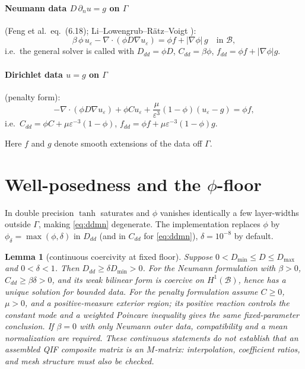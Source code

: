 \documentclass[11pt]{article}
\newtheorem{lemma}[theorem]{Lemma}
\theoremstyle{remark}
\newcommand{\dive}{\nabla\!\cdot\!}
\newcommand{\eps}{\varepsilon}
\newcommand{\B}{\mathcal{B}}
\begin{document}
\paragraph{Neumann data $D\,\partial_n u = g$ on $\Gamma$} (Feng et
al.\ eq.~(6.18); Li--Lowengrub--R\"atz--Voigt \cite{LLRV}):
\begin{equation}\label{eq:ddmn}
  \beta\,\phi\,u_\eps-\dive(\phi D\nabla u_\eps)
  = \phi f + |\nabla\phi|\,g
  \quad\text{in }\B,
\end{equation}
i.e.\ the general solver is called with
$D_{dd}=\phi D$, $C_{dd}=\beta\phi$, $f_{dd}=\phi f+|\nabla\phi|g$.

\paragraph{Dirichlet data $u=g$ on $\Gamma$} (penalty form):
\begin{equation}\label{eq:ddmd}
  -\dive(\phi D\nabla u_\eps)+\phi C u_\eps
  +\frac{\mu}{\eps^3}(1-\phi)(u_\eps-g)=\phi f ,
\end{equation}
i.e.\ $C_{dd}=\phi C+\mu\eps^{-3}(1-\phi)$,
$f_{dd}=\phi f+\mu\eps^{-3}(1-\phi)g$.

Here $f$ and $g$ denote smooth extensions of the data off $\Gamma$.

\section{Well-posedness and the $\phi$-floor}

In double precision $\tanh$ saturates and $\phi$ vanishes identically a
few layer-widths outside $\Gamma$, making \eqref{eq:ddmn} degenerate.
The implementation replaces $\phi$ by
$\phi_\delta=\max(\phi,\delta)$ in $D_{dd}$ (and in $C_{dd}$ for
\eqref{eq:ddmn}), $\delta=10^{-8}$ by default.

\begin{lemma}[continuous coercivity at fixed floor]
Suppose $0<D_{\min}\le D\le D_{\max}$ and $0<\delta<1$.
Then $D_{dd}\ge\delta D_{\min}>0$. For the Neumann formulation with
$\beta>0$, $C_{dd}\ge\beta\delta>0$, and its weak bilinear form is
coercive on $H^1(\B)$, hence has a unique solution for bounded data.
For the penalty formulation assume $C\ge0$, $\mu>0$, and a positive-measure
exterior region; its positive reaction controls the constant mode and a
weighted Poincare inequality gives the same fixed-parameter conclusion.
If $\beta=0$ with only Neumann outer data, compatibility and a mean
normalization are required. These continuous statements do not establish
that an assembled QIF composite matrix is an $M$-matrix: interpolation,
coefficient ratios, and mesh structure must also be checked.
\end{lemma}
\end{document}
